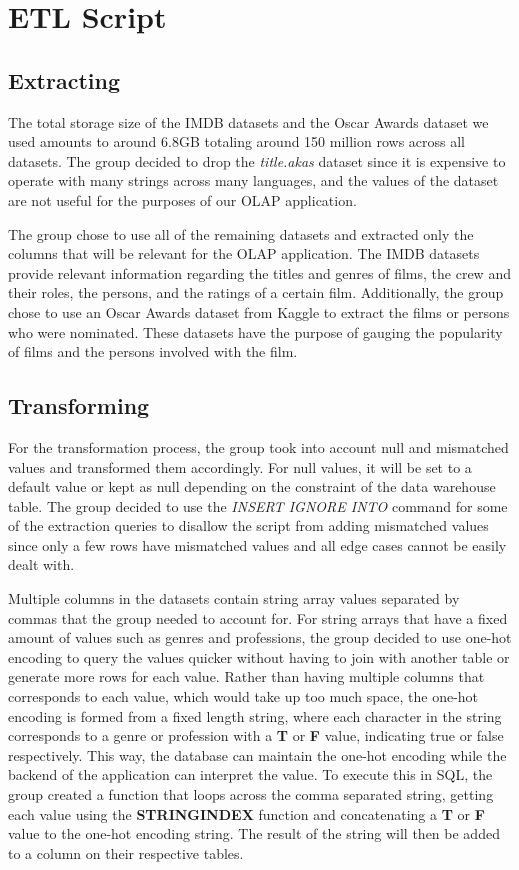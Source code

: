 \section{ETL Script}\label{etl}
\subsection{Extracting}
The total storage size of the IMDB datasets and the Oscar Awards dataset we used amounts to around 6.8GB totaling around 150 million rows across all datasets. The group decided to drop the \textit{title.akas} dataset since it is expensive to operate with many strings across many languages, and the values of the dataset are not useful for the purposes of our OLAP application. 

The group chose to use all of the remaining datasets and extracted only the columns that will be relevant for the OLAP application. The IMDB datasets provide relevant information regarding the titles and genres of films, the crew and their roles, the persons, and the ratings of a certain film. Additionally, the group chose to use an Oscar Awards dataset from Kaggle to extract the films or persons who were nominated. These datasets have the purpose of gauging the popularity of films and the persons involved with the film.

\subsection{Transforming}
For the transformation process, the group took into account null and mismatched values and transformed them accordingly. For null values, it will be set to a default value or kept as null depending on the constraint of the data warehouse table. The group decided to use the \textit{INSERT IGNORE INTO} command for some of the extraction queries to disallow the script from adding mismatched values since only a few rows have mismatched values and all edge cases cannot be easily dealt with.

Multiple columns in the datasets contain string array values separated by commas that the group needed to account for. For string arrays that have a fixed amount of values such as genres and professions, the group decided to use one-hot encoding to query the values quicker without having to join with another table or generate more rows for each value. Rather than having multiple columns that corresponds to each value, which would take up too much space, the one-hot encoding is formed from a fixed length string, where each character in the string corresponds to a genre or profession with a \textbf{T} or \textbf{F} value, indicating true or false respectively. This way, the database can maintain the one-hot encoding while the backend of the application can interpret the value. To execute this in SQL, the group created a function that loops across the comma separated string, getting each value using the \textbf{STRING\textunderscore INDEX} function and concatenating a \textbf{T} or \textbf{F} value to the one-hot encoding string. The result of the string will then be added to a column on their respective tables.

